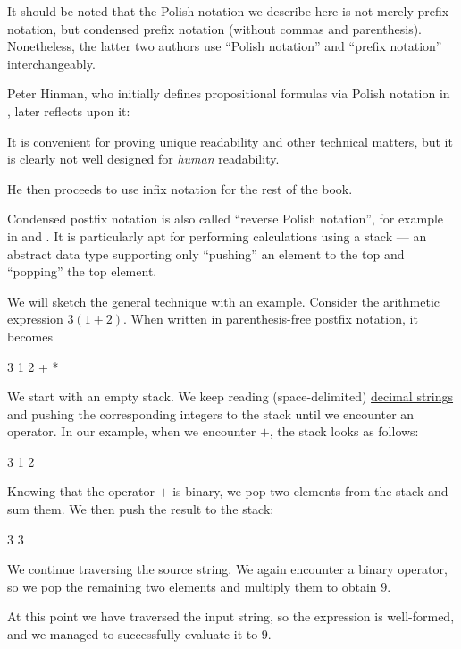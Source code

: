 \begin{remark}
\begin{thmenum}
    It should be noted that the Polish notation we describe here is not merely prefix notation, but condensed prefix notation (without commas and parenthesis). Nonetheless, the latter two authors use \enquote{Polish notation} and \enquote{prefix notation} interchangeably.

    Peter Hinman, who initially defines propositional formulas via Polish notation in \cite[def. 1.1.2]{Hinman2005Logic}, later reflects upon it:
    \begin{displayquote}
      It is convenient for proving unique readability and other technical matters, but it is clearly not well designed for \textit{human} readability.
    \end{displayquote}

    He then proceeds to use infix notation for the rest of the book.

     Condensed postfix notation is also called \enquote{reverse Polish notation}, for example in \cite[833]{HighamEtAl2015PrincetonCompanion} and \cite[817]{Rosen2019DiscreteMathematics}. It is particularly apt for performing calculations using a stack --- an abstract data type supporting only \enquote{pushing} an element to the top and \enquote{popping} the top element.

    We will sketch the general technique with an example. Consider the arithmetic expression \( 3(1 + 2) \). When written in parenthesis-free postfix notation, it becomes
    \begin{MemoryLine}
      3 1 2 + *
    \end{MemoryLine}

    We start with an empty stack. We keep reading (space-delimited) \hyperref[def:positional_number_system/decimal]{decimal strings} and pushing the corresponding integers to the stack until we encounter an operator. In our example, when we encounter \( + \), the stack looks as follows:
    \begin{MemoryLine}
      3 1 2
    \end{MemoryLine}

    Knowing that the operator \( + \) is binary, we pop two elements from the stack and sum them. We then push the result to the stack:
    \begin{MemoryLine}
      3 3
    \end{MemoryLine}

    We continue traversing the source string. We again encounter a binary operator, so we pop the remaining two elements and multiply them to obtain \( 9 \).

    At this point we have traversed the input string, so the expression is well-formed, and we managed to successfully evaluate it to \( 9 \).
  \end{thmenum}
\end{remark}

